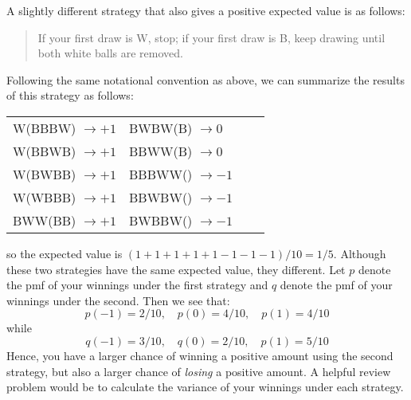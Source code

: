 \documentclass[addpoints,12pt]{exam}
\begin{document}
\begin{questions}
\begin{solution}
  A slightly different strategy that also gives a positive expected value is as follows: 
  \begin{quote}
    If your first draw is W, stop; if your first draw is B, keep drawing until both white balls are removed.
  \end{quote}
  Following the same notational convention as above, we can summarize the results of this strategy as follows:
  \begin{center}
    \begin{tabular}[h]{llll}
      W(BBBW) $\rightarrow +1$& BWBW(B) $\rightarrow 0$\\
      W(BBWB) $\rightarrow +1$& BBWW(B) $\rightarrow 0$\\
      W(BWBB) $\rightarrow +1$& BBBWW() $\rightarrow -1$\\
      W(WBBB) $\rightarrow +1$& BBWBW() $\rightarrow -1$\\
      BWW(BB) $\rightarrow +1$& BWBBW() $\rightarrow -1$
    \end{tabular}
  \end{center}
  so the expected value is $(1 + 1 + 1 + 1 + 1 - 1 - 1 - 1)/10 = 1/5$.
  Although these two strategies have the same expected value, they different. 
  Let $p$ denote the pmf of your winnings under the first strategy and $q$ denote the pmf of your winnings under the second.
  Then we see that:
  \[
    p(-1) = 2/10, \quad p(0) = 4/10, \quad p(1) = 4/10
  \]
  while 
  \[
    q(-1) = 3/10, \quad q(0) = 2/10, \quad p(1) = 5/10
  \]
  Hence, you have a larger chance of winning a positive amount using the second strategy, but also a larger chance of \emph{losing} a positive amount.
  A helpful review problem would be to calculate the variance of your winnings under each strategy.
  
  \end{solution}


\end{questions}
\end{document}
